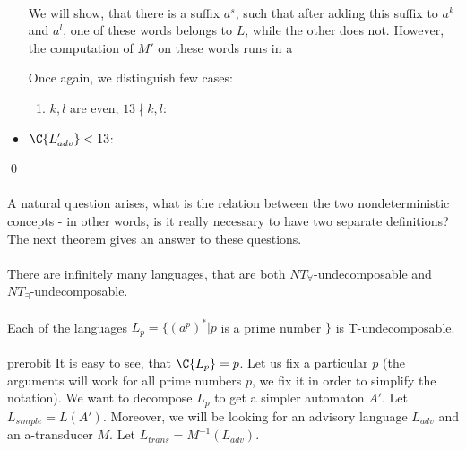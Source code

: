 \begin{itemize}
\paragraph{}
We will show, that there is a suffix $a^s$, such that after adding this suffix to $a^k$ and $a^l$, one of these words belongs to $L$, while the other does not. However, the computation of $M'$ on these words runs in a 

Once again, we distinguish few cases:

\begin{enumerate}
\item $k,l$ are even, $13 \nmid k,l$: 
\end{enumerate}

\item $\C{L'_{adv}} < 13$:
\end{itemize} \qed

\paragraph{}
A natural question arises, what is the relation between the two nondeterministic concepts - in other words, is it really necessary to have two separate definitions? The next theorem gives an answer to these questions.

\paragraph{}
\cveta There are infinitely many languages, that are both $NT_{\forall}$-undecomposable and $NT_{\exists}$-undecomposable.

\paragraph{}
\dokaz Each of the languages $L_{p} = \{ (a^p)^* | p$ is a prime number $\}$ is T-undecomposable.

\paragraph{}
\color{red}prerobit\color{black}
It is easy to see, that $\C{L_p} = p$. Let us fix a particular $p$ (the arguments will work for all prime numbers $p$, we fix it in order to simplify the notation). We want to decompose $L_p$ to get a simpler automaton $A'$. Let $L_{simple} = L(A')$. Moreover, we will be looking for an advisory language $L_{adv}$ and an a-transducer $M$. Let $L_{trans} = M^{-1}(L_{adv})$.

